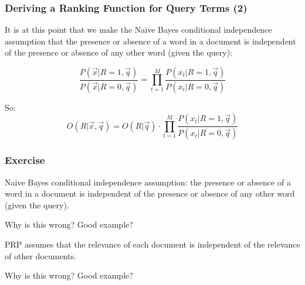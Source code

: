 \documentclass[compress]{beamer}
\def\myblue#1{\textcolor{texblue}{#1}}
\begin{document}
\begin{frame}[<+->]
\frametitle{Deriving a Ranking Function for Query Terms (2)}
\pause[2]

It is at this point that we make the \myblue{Naive Bayes conditional independence assumption} that the presence or absence of a word in a document is independent of the presence or absence of any other word (given the query):

\begin{equation}
\nonumber
\frac{P(\vec{x}|R=1,\vec{q})}{P(\vec{x}|R=0,\vec{q})} = \prod_{t=1}^M
\frac{P(x_t|R=1,\vec{q})}{P(x_t|R=0,\vec{q})}
\end{equation}

So:
\begin{equation}
\nonumber
O(R|\vec{x},\vec{q}) = O(R|\vec{q}) \cdot \prod_{t=1}^M
\frac{P(x_t|R=1,\vec{q})}{P(x_t|R=0,\vec{q})}
\end{equation}
\end{frame}

\begin{frame}[<+->]
\frametitle{Exercise}
\pause[2]

Naive Bayes conditional independence assumption:  the
presence or absence of a word in a document is independent
of the presence or absence of any other word (given the
query).

\pause

\myblue{Why is this wrong? Good example? }

\pause

PRP assumes that the relevance of each document is
independent of the relevance of other documents.

\pause

\myblue{Why is this wrong? Good example?}



\end{frame}
\end{document}
